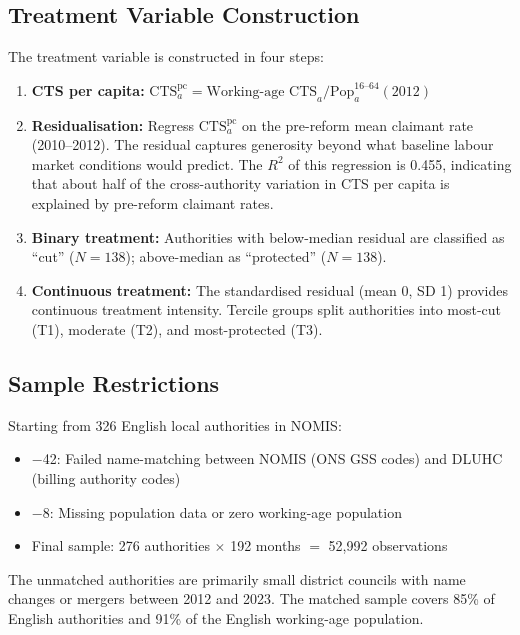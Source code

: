\documentclass[12pt]{article}
\begin{document}
\subsection{Treatment Variable Construction}

The treatment variable is constructed in four steps:

\begin{enumerate}
\item \textbf{CTS per capita:} $\text{CTS}_{a}^{\text{pc}} = \text{Working-age CTS}_{a} / \text{Pop}_{a}^{16\text{--}64}(2012)$

\item \textbf{Residualisation:} Regress $\text{CTS}_{a}^{\text{pc}}$ on the pre-reform mean claimant rate (2010--2012). The residual captures generosity beyond what baseline labour market conditions would predict. The $R^2$ of this regression is 0.455, indicating that about half of the cross-authority variation in CTS per capita is explained by pre-reform claimant rates.

\item \textbf{Binary treatment:} Authorities with below-median residual are classified as ``cut'' ($N = 138$); above-median as ``protected'' ($N = 138$).

\item \textbf{Continuous treatment:} The standardised residual (mean 0, SD 1) provides continuous treatment intensity. Tercile groups split authorities into most-cut (T1), moderate (T2), and most-protected (T3).
\end{enumerate}

\subsection{Sample Restrictions}

Starting from 326 English local authorities in NOMIS:
\begin{itemize}
\item $-$42: Failed name-matching between NOMIS (ONS GSS codes) and DLUHC (billing authority codes)
\item $-$8: Missing population data or zero working-age population
\item Final sample: 276 authorities $\times$ 192 months $=$ 52,992 observations
\end{itemize}

The unmatched authorities are primarily small district councils with name changes or mergers between 2012 and 2023. The matched sample covers 85\% of English authorities and 91\% of the English working-age population.
\end{document}
